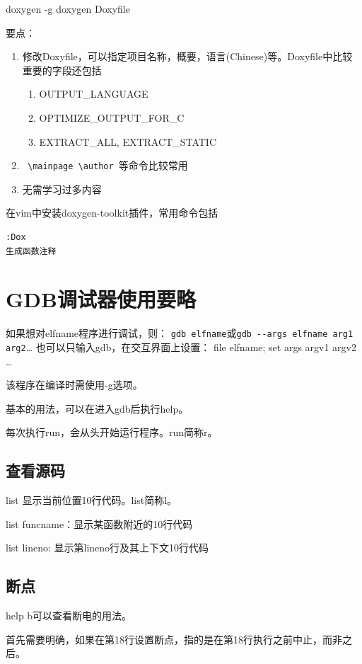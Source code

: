 \begin{shellcmd}
doxygen -g
doxygen Doxyfile
\end{shellcmd}

要点：
\begin{enumerate}
	\item 修改Doxyfile，可以指定项目名称，概要，语言(Chinese)等。Doxyfile中比较重要的字段还包括
	\begin{enumerate}
		\item OUTPUT\_LANGUAGE
		\item OPTIMIZE\_OUTPUT\_FOR\_C
		\item EXTRACT\_ALL, EXTRACT\_STATIC
	\end{enumerate}
	\item \verb+ \mainpage \author +等命令比较常用
	\item 无需学习过多内容
\end{enumerate}

在vim中安装doxygen-toolkit插件，常用命令包括
\begin{verbatim}
:Dox
生成函数注释
\end{verbatim}

\section{GDB调试器使用要略}


如果想对elfname程序进行调试，则：
\verb+gdb elfname+或\verb+gdb --args elfname arg1 arg2+\ldots
也可以只输入gdb，在交互界面上设置：
file elfname;
set args argv1 argv2 \ldots 

该程序在编译时需使用-g选项。

基本的用法，可以在进入gdb后执行help。

每次执行run，会从头开始运行程序。run简称r。

\subsection{查看源码}
list 显示当前位置10行代码。list简称l。

list funcname：显示某函数附近的10行代码

list lineno: 显示第lineno行及其上下文10行代码


\subsection{断点}
help b可以查看断电的用法。

首先需要明确，如果在第18行设置断点，指的是在第18行执行之前中止，而非之后。

